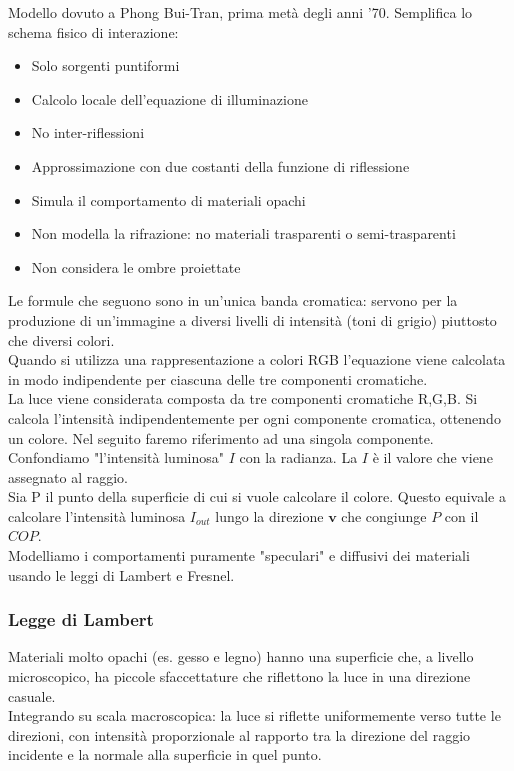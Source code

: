 \documentclass[a4paper, 10pt]{article}
\renewcommand{\vec}{\bm}
\begin{document}
			\bigskip
		
			\noindent
			Modello dovuto a Phong Bui-Tran, prima metà degli anni '70.
			Semplifica lo schema fisico di interazione:
			\begin{itemize}
				\item Solo sorgenti puntiformi
				\item Calcolo locale dell’equazione di illuminazione
				\item No inter-riflessioni
				\item Approssimazione con due costanti della funzione di riflessione
				\item Simula il comportamento di materiali opachi
				\item Non modella la rifrazione: no materiali trasparenti o semi-trasparenti
				\item Non considera le ombre proiettate
			\end{itemize}
			Le formule che seguono sono in un’unica banda cromatica:
			servono per la produzione di un’immagine a diversi livelli di
			intensità (toni di grigio) piuttosto che diversi colori.\\
			Quando si utilizza una rappresentazione a colori RGB
			l’equazione viene calcolata in modo indipendente per ciascuna
			delle tre componenti cromatiche.\\
			La luce viene considerata composta da tre componenti
			cromatiche R,G,B. Si calcola l’intensità indipendentemente per
			ogni componente cromatica, ottenendo un colore. 
			Nel seguito faremo riferimento ad una singola componente.\\
			Confondiamo "l’intensità luminosa" $ I $ con la radianza. La $ I $ è il
			valore che viene assegnato al raggio.\\
			Sia P il punto della superficie di cui si vuole calcolare il colore.
			Questo equivale a calcolare l’intensità luminosa $ I_{out} $ lungo la
			direzione $ \vec{v} $ che congiunge $ P $ con il $ COP $.\\
			Modelliamo i comportamenti puramente "speculari" e diffusivi
			dei materiali usando le leggi di Lambert e Fresnel.
			
		\subsubsection{Legge di Lambert}
			Materiali molto opachi (es.	gesso e legno) hanno una
			superficie che, a livello microscopico, ha piccole
			sfaccettature che riflettono la luce in una direzione casuale.\\
			Integrando su scala macroscopica: la luce si riflette
			uniformemente verso tutte le direzioni, con intensità
			proporzionale al rapporto tra la direzione del raggio incidente e
			la normale alla superficie in quel punto.
			
\end{document}
